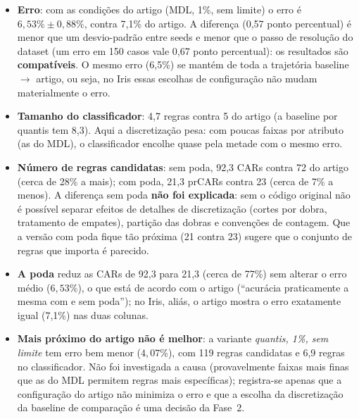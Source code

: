 \documentclass[a4paper,11pt]{article}
\begin{document}
\begin{itemize}
  \item \textbf{Erro}: com as condições do artigo (MDL, 1\%, sem limite) o erro é $6{,}53\% \pm 0{,}88\%$, contra 7,1\% do artigo. A diferença (0,57 ponto percentual) é menor que um desvio-padrão entre seeds e menor que o passo de resolução do dataset (um erro em 150 casos vale 0,67 ponto percentual): os resultados são \textbf{compatíveis}. O mesmo erro (6,5\%) se mantém de toda a trajetória baseline $\to$ artigo, ou seja, no Iris essas escolhas de configuração não mudam materialmente o erro.
  \item \textbf{Tamanho do classificador}: 4,7 regras contra 5 do artigo (a baseline por quantis tem 8,3). Aqui a discretização pesa: com poucas faixas por atributo (as do MDL), o classificador encolhe quase pela metade com o mesmo erro.
  \item \textbf{Número de regras candidatas}: sem poda, 92,3 CARs contra 72 do artigo (cerca de 28\% a mais); com poda, 21,3 prCARs contra 23 (cerca de 7\% a menos). A diferença sem poda \textbf{não foi explicada}: sem o código original não é possível separar efeitos de detalhes de discretização (cortes por dobra, tratamento de empates), partição das dobras e convenções de contagem. Que a versão com poda fique tão próxima (21 contra 23) sugere que o conjunto de regras que importa é parecido.
  \item \textbf{A poda} reduz as CARs de 92,3 para 21,3 (cerca de 77\%) sem alterar o erro médio ($6{,}53\%$), o que está de acordo com o artigo (``acurácia praticamente a mesma com e sem poda''); no Iris, aliás, o artigo mostra o erro exatamente igual (7,1\%) nas duas colunas.
  \item \textbf{Mais próximo do artigo não é melhor}: a variante \emph{quantis, 1\%, sem limite} tem erro bem menor ($4{,}07\%$), com 119 regras candidatas e 6,9 regras no classificador. Não foi investigada a causa (provavelmente faixas mais finas que as do MDL permitem regras mais específicas); registra-se apenas que a configuração do artigo não minimiza o erro e que a escolha da discretização da baseline de comparação é uma decisão da Fase~2.
\end{itemize}
\end{document}
